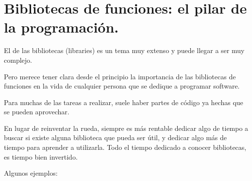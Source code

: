 \documentclass[spanish,12pt,a4paper,final,oneside]{book}
\begin{document}
\chapter{Bibliotecas de funciones: el pilar de la programación.} \label{la_importancia_de_las_bibliotecas} 

El de las bibliotecas (libraries) es un tema muy extenso y puede llegar a ser muy complejo.

Pero merece tener clara desde el principio la importancia de las bibliotecas de funciones en la vida de cualquier persona que se dedique a programar software.

Para muchas de las tareas a realizar, suele haber partes de código ya hechas que se pueden aprovechar.

En lugar de reinventar la rueda, siempre es más rentable dedicar algo de tiempo a buscar si existe alguna biblioteca que pueda ser útil, y dedicar algo más de tiempo para aprender a utilizarla. Todo el tiempo dedicado a conocer bibliotecas, es tiempo bien invertido.


\vspace{0.3cm}
Algunos ejemplos:
\end{document}

